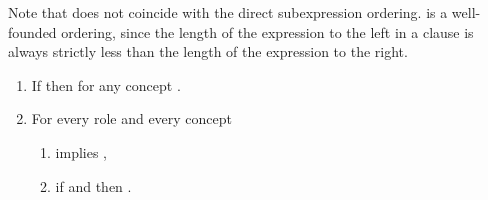 \documentclass[leqno
,pdflatex
,prodmode
,acmtocl
]{acmsmall}
\begin{document}
Note that  does not coincide with the direct subexpression ordering.  is a well-founded ordering, 
since the length of the expression to the left in a clause is always strictly less than the 
length of the expression to the right.
\begin{lemma}\label{lemma: reflection}
\begin{enumerate}[(1)]
\item\label{prop: C}
 If  then  for any concept . 
\item\label{prop: R} For every role  
                     and every concept 
    \begin{enumerate}
        \item\label{prop: R: 1}  implies ,
        \item\label{prop: R: 2} if  and 
              then .
    \end{enumerate}
\end{enumerate}
\end{lemma}
\end{document}
